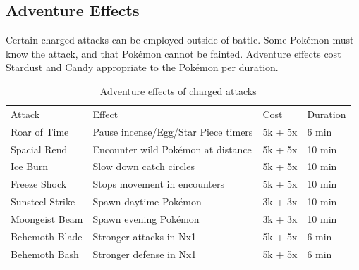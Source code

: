 \subsection{Adventure Effects\label{sec:effects}}
Certain charged attacks can be employed outside of battle.
Some Pokémon must know the attack, and that Pokémon cannot be fainted.
Adventure effects cost Stardust and Candy appropriate to the Pokémon
  per duration.
\begin{table}
  \centering
  \begin{tabular}{llll}
    Attack & Effect & Cost & Duration\\
    \Midrule
    Roar of Time & Pause incense/Egg/Star Piece timers & 5k + 5x & 6 min\\
    Spacial Rend & Encounter wild Pokémon at distance & 5k + 5x & 10 min\\
    Ice Burn & Slow down catch circles & 5k + 5x & 10 min\\
    Freeze Shock & Stops movement in encounters & 5k + 5x & 10 min\\
    Sunsteel Strike & Spawn daytime Pokémon & 3k + 3x & 10 min\\
    Moongeist Beam & Spawn evening Pokémon & 3k + 3x & 10 min\\
    Behemoth Blade & Stronger attacks in Nx1 & 5k + 5x & 6 min\\
    Behemoth Bash & Stronger defense in Nx1 & 5k + 5x & 6 min\\
  \end{tabular}
  \caption{Adventure effects of charged attacks\label{table:adveffects}}
\end{table}

